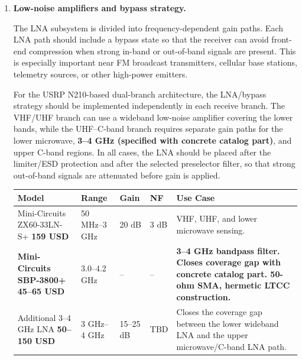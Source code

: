 \documentclass[11pt,a4paper]{article}
\newcommand{\blue}[1]{\textcolor{priceblue}{\textbf{#1}}}
\newcommand{\gc}{\textbullet}
\begin{document}
	\begin{enumerate}[label=\roman*)]
		
		\item \textbf{Low-noise amplifiers and bypass strategy.}
		
		The LNA subsystem is divided into frequency-dependent gain paths. Each LNA path
		should include a bypass state so that the receiver can avoid front-end
		compression when strong in-band or out-of-band signals are present. This is
		especially important near FM broadcast transmitters, cellular base stations,
		telemetry sources, or other high-power emitters.
		
		For the USRP N210-based dual-branch architecture, the LNA/bypass strategy should
		be implemented independently in each receive branch. The VHF/UHF branch can use
		a wideband low-noise amplifier covering the lower bands, while the UHF--C-band
		branch requires separate gain paths for the lower microwave, \textbf{3--4 GHz
			(specified with concrete catalog part)}, and upper C-band regions. In all
		cases, the LNA should be placed after the limiter/ESD protection and after the
		selected preselector filter, so that strong out-of-band signals are attenuated
		before gain is applied.
		
		\begin{table}[!ht]
			\centering
			\small
			\begin{tabular}{p{4.1cm}p{2.4cm}p{1.7cm}p{1.5cm}p{4.7cm}}
				\toprule
				\textbf{Model} &
				\textbf{Range} &
				\textbf{Gain} &
				\textbf{NF} &
				\textbf{Use Case} \\
				\midrule
				
				Mini-Circuits ZX60-33LN-S+
				\blue{159 USD}
				\href{https://www.minicircuits.com/WebStore/dashboard.html?model=ZX60-33LN-S\%2B}{\gc} &
				50 MHz--3 GHz &
				20 dB &
				3 dB &
				VHF, UHF, and lower microwave sensing. \\
				
				\textbf{Mini-Circuits SBP-3800+}
				\blue{45--65 USD} &
				3.0--4.2 GHz &
				-- &
				-- &
				\textbf{3--4 GHz bandpass filter. Closes coverage gap with
					concrete catalog part. 50-ohm SMA, hermetic LTCC construction.} \\
				
				Additional 3--4 GHz LNA
				\blue{50--150 USD} &
				3 GHz--4 GHz &
				15--25 dB &
				TBD &
				Closes the coverage gap between the lower wideband LNA and the upper
				microwave/C-band LNA path. \\
				

\end{tabular}
\end{table}
\end{enumerate}
\end{document}
